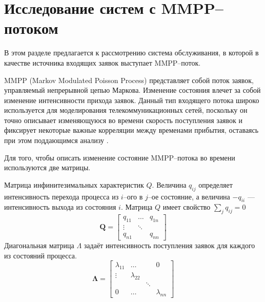 \section {Исследование систем с MMPP--потоком} \label{mmpp_section}
В этом разделе предлагается к рассмотрению система обслуживания, в которой в качестве источника входящих заявок выступает MMPP--поток.

MMPP (Markov Modulated Poisson Process) представляет собой поток заявок, управляемый непрерывной цепью Маркова. Изменение состояния влечет за собой изменение интенсивности прихода заявок. Данный тип входящего потока широко используется для моделирования телекоммуникационных сетей, поскольку он точно описывает изменяющуюся во времени скорость поступления заявок и фиксирует некоторые важные корреляции между временами прибытия, оставаясь при этом поддающимся анализу \cite{fischer1993markov}.
 
Для того, чтобы описать изменение состояние MMPP--потока во времени используются две матрицы.

Матрица инфинитезимальных характеристик $Q$. Величина $q_{ij}$ определяет интенсивность перехода процесса из $i$--ого в $j$--ое состояние, а величина $-q_{ii}$ --- интенсивность выхода из состояния $i$.
Матрица $Q$ имеет свойство $\sum_{j}q_{ij} = 0$
\begin{equation*}
	\boldsymbol{Q}=\begin{bmatrix}
		q_{11} &  \dots &  q_{1n}\\
		\vdots & \ddots &  \\
		q_{n1} &    	&	q_{nn}
	\end{bmatrix}
\end{equation*}
Диагональная матрица $\Lambda$ задаёт интенсивность поступления заявок для каждого из состояний процесса.
\begin{equation*}
	\boldsymbol{\Lambda}=\begin{bmatrix}
		\lambda_{11}&	\dots	&   	 & 0\\
		\vdots 		&\lambda_{22}&  	 &   \\
		       		&    		& \ddots &   \\
		0  			&   \dots 	&		 & \lambda_{nn}
	\end{bmatrix}
\end{equation*}


